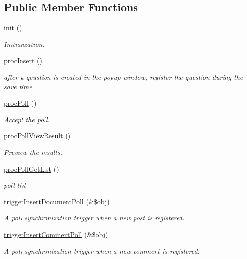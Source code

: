 \subsection*{Public Member Functions}
\begin{DoxyCompactItemize}
\item 
\hyperlink{classpollController_a963891da278c1adc2400f688270342a2}{init} ()
\begin{DoxyCompactList}\small\item\em Initialization. \end{DoxyCompactList}\item 
\hyperlink{classpollController_a659a053cb3782d589eec7fb4c536905b}{proc\+Insert} ()
\begin{DoxyCompactList}\small\item\em after a qeustion is created in the popup window, register the question during the save time \end{DoxyCompactList}\item 
\hyperlink{classpollController_a78770967734dc31fdfe1bba48d7e6196}{proc\+Poll} ()
\begin{DoxyCompactList}\small\item\em Accept the poll. \end{DoxyCompactList}\item 
\hyperlink{classpollController_a0fedbcad279a12cdf95a0f1d878bbfea}{proc\+Poll\+View\+Result} ()
\begin{DoxyCompactList}\small\item\em Preview the results. \end{DoxyCompactList}\item 
\hyperlink{classpollController_a7b10edf49b567e9d239c2e6bf8b12e93}{proc\+Poll\+Get\+List} ()
\begin{DoxyCompactList}\small\item\em poll list \end{DoxyCompactList}\item 
\hyperlink{classpollController_ae2ad5e6f6c89c2aee07208a8a66ef5e7}{trigger\+Insert\+Document\+Poll} (\&\$obj)
\begin{DoxyCompactList}\small\item\em A poll synchronization trigger when a new post is registered. \end{DoxyCompactList}\item 
\hyperlink{classpollController_a9676dc5c2762bf1c7818828d6ccf3efa}{trigger\+Insert\+Comment\+Poll} (\&\$obj)
\begin{DoxyCompactList}\small\item\em A poll synchronization trigger when a new comment is registered. \end{DoxyCompactList}\item 

\end{DoxyCompactItemize}
